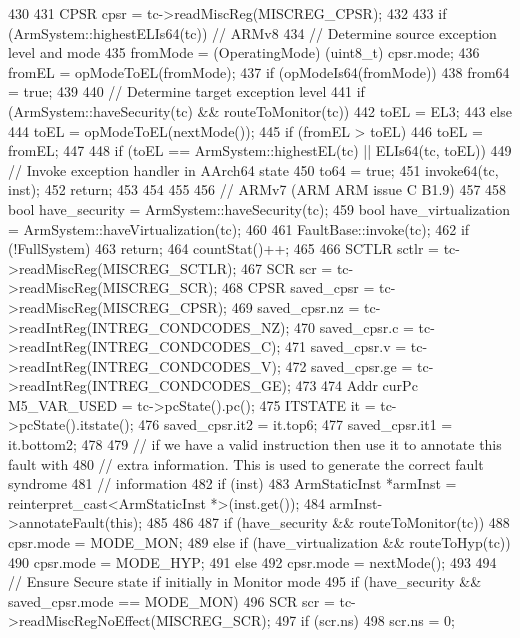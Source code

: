 \begin{DoxyCode}
430 {
431     CPSR cpsr = tc->readMiscReg(MISCREG_CPSR);
432 
433     if (ArmSystem::highestELIs64(tc)) {  // ARMv8
434         // Determine source exception level and mode
435         fromMode = (OperatingMode) (uint8_t) cpsr.mode;
436         fromEL = opModeToEL(fromMode);
437         if (opModeIs64(fromMode))
438             from64 = true;
439 
440         // Determine target exception level
441         if (ArmSystem::haveSecurity(tc) && routeToMonitor(tc))
442             toEL = EL3;
443         else
444             toEL = opModeToEL(nextMode());
445         if (fromEL > toEL)
446             toEL = fromEL;
447 
448         if (toEL == ArmSystem::highestEL(tc) || ELIs64(tc, toEL)) {
449             // Invoke exception handler in AArch64 state
450             to64 = true;
451             invoke64(tc, inst);
452             return;
453         }
454     }
455 
456     // ARMv7 (ARM ARM issue C B1.9)
457 
458     bool have_security       = ArmSystem::haveSecurity(tc);
459     bool have_virtualization = ArmSystem::haveVirtualization(tc);
460 
461     FaultBase::invoke(tc);
462     if (!FullSystem)
463         return;
464     countStat()++;
465 
466     SCTLR sctlr = tc->readMiscReg(MISCREG_SCTLR);
467     SCR scr = tc->readMiscReg(MISCREG_SCR);
468     CPSR saved_cpsr = tc->readMiscReg(MISCREG_CPSR);
469     saved_cpsr.nz = tc->readIntReg(INTREG_CONDCODES_NZ);
470     saved_cpsr.c = tc->readIntReg(INTREG_CONDCODES_C);
471     saved_cpsr.v = tc->readIntReg(INTREG_CONDCODES_V);
472     saved_cpsr.ge = tc->readIntReg(INTREG_CONDCODES_GE);
473 
474     Addr curPc M5_VAR_USED = tc->pcState().pc();
475     ITSTATE it = tc->pcState().itstate();
476     saved_cpsr.it2 = it.top6;
477     saved_cpsr.it1 = it.bottom2;
478 
479     // if we have a valid instruction then use it to annotate this fault with
480     // extra information. This is used to generate the correct fault syndrome
481     // information
482     if (inst) {
483         ArmStaticInst *armInst = reinterpret_cast<ArmStaticInst *>(inst.get());
484         armInst->annotateFault(this);
485     }
486 
487     if (have_security && routeToMonitor(tc))
488         cpsr.mode = MODE_MON;
489     else if (have_virtualization && routeToHyp(tc))
490         cpsr.mode = MODE_HYP;
491     else
492         cpsr.mode = nextMode();
493 
494     // Ensure Secure state if initially in Monitor mode
495     if (have_security && saved_cpsr.mode == MODE_MON) {
496         SCR scr = tc->readMiscRegNoEffect(MISCREG_SCR);
497         if (scr.ns) {
498             scr.ns = 0;
}}}
\end{DoxyCode}
